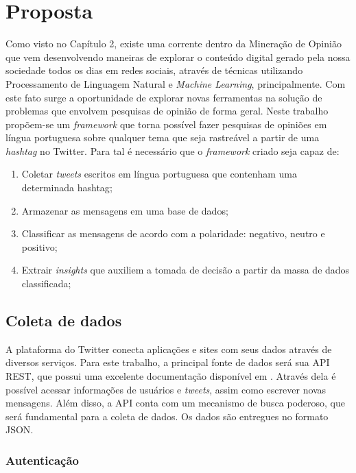 \chapter{Proposta} \label{cap:proposta}

Como visto no Capítulo 2, existe uma corrente dentro da Mineração de Opinião que vem desenvolvendo maneiras de explorar o conteúdo digital gerado pela nossa sociedade todos os dias em redes sociais, através de técnicas utilizando Processamento de Linguagem Natural e \textit{Machine Learning}, principalmente. Com este fato surge a oportunidade de explorar novas ferramentas na
solução de problemas que envolvem pesquisas de opinião de forma geral.
Neste trabalho propõem-se um \textit{framework} que torna possível fazer pesquisas de opiniões em língua portuguesa sobre qualquer tema que seja rastreável a partir de uma \textit{hashtag} no Twitter.
Para tal é necessário que o \textit{framework} criado seja capaz de:

\begin{enumerate}
	\item Coletar \textit{tweets} escritos em língua portuguesa que contenham uma determinada {hashtag};
	\item Armazenar as mensagens em uma base de dados;
	\item Classificar as mensagens de acordo com a polaridade: negativo, neutro e positivo;
	\item Extrair \textit{insights} que auxiliem a tomada de decisão a partir da massa de dados classificada;
\end{enumerate}

\section{Coleta de dados}
A plataforma do Twitter conecta aplicações e sites com seus dados através de diversos serviços. Para este trabalho, a principal fonte de dados será sua API REST, que possui uma excelente documentação disponível em \cite{twitterapidocs}. Através dela é possível acessar informações de usuários e \textit{tweets}, assim como escrever novas mensagens. Além disso, a API conta com um mecanismo de busca poderoso, que será fundamental para a coleta de dados. Os dados são entregues no formato \ac{JSON}.

\subsection{Autenticação}

